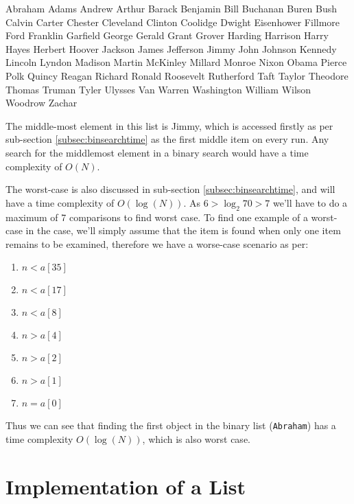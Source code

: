 \documentclass[a4paper,11pt]{article}
\begin{document}
\begin{tiny}
Abraham Adams Andrew Arthur Barack Benjamin Bill Buchanan Buren Bush Calvin Carter Chester Cleveland Clinton Coolidge Dwight Eisenhower Fillmore Ford Franklin Garfield George Gerald Grant Grover Harding Harrison Harry Hayes Herbert Hoover Jackson James Jefferson Jimmy John Johnson Kennedy Lincoln Lyndon Madison Martin McKinley Millard Monroe Nixon Obama Pierce Polk Quincy Reagan Richard Ronald Roosevelt Rutherford Taft Taylor Theodore Thomas Truman Tyler Ulysses Van Warren Washington William Wilson Woodrow Zachar
\end{tiny}

The middle-most element in this list is Jimmy, which is accessed firstly as per sub-section \ref{subsec:binsearchtime} as the first middle item on every run. Any search for the middlemost element in a binary search would have a time complexity of $O(N)$.

The worst-case is also discussed in sub-section \ref{subsec:binsearchtime}, and will have a time complexity of $O(\log(N))$. As $6 > \log_{2}{70} > 7$ we'll have to do a maximum of 7 comparisons to find worst case. To find one example of a worst-case in the case, we'll simply assume that the item is found when only one item remains to be examined, therefore we have a worse-case scenario as per:

\begin{enumerate}
\item $n < a[35]$
\item $n < a[17]$
\item $n < a[8]$
\item $n > a[4]$
\item $n > a[2]$
\item $n > a[1]$
\item $n = a[0]$
\end{enumerate}

Thus we can see that finding the first object in the binary list (\texttt{Abraham}) has a time complexity $O(\log(N))$, which is also worst case.

\section{Implementation of a List}
\end{document}
